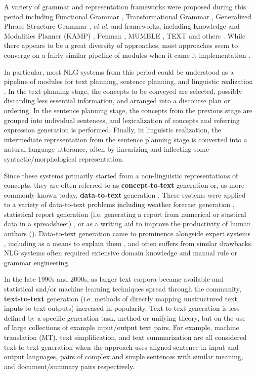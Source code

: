 A variety of grammar and representation frameworks were proposed during this
period including Functional Grammar \citep{halliday2013halliday}, Transformational Grammar \citep{chomsky1965aspects}, Generalized Phrase Structure Grammar \citep{gazdar1985generalized}, \textit{et al.} and frameworks, including Knowledge
and Modalities Planner (KAMP) \citep{appelt1982planning}, Penman \citep{hovy1993natural}, MUMBLE \citep{McDonald1981MUMBLEAF}, TEXT \citep{mckeown1982text} and others \citep{mann1981text}.
While there appears to be a great diversity of approaches, most approaches
seem to converge on a fairly similar pipeline of modules when it came 
it implementation \citep{reiter1994has}. 

In particular, most NLG systems from this
period could be understood as a pipeline of modules for text planning,
sentence planning, and linguistic realization \citep{reiter1997building}.
In the text planning stage, the concepts to be conveyed are selected,
possibly discarding less essential information, and arranged into a discourse
plan or ordering. In the sentence planning stage,
the concepts from the previous stage are grouped into individual sentences,
and lexicalization of concepts and referring expression generation is performed.
Finally, in linguistic realization, the intermediate representation from 
the sentence planning stage is converted into a natural language utterance,
often by linearizing and inflecting some syntactic/morphological representation.

Since these systems primarily started from a non-linguistic representations 
of concepts, they are often referred to as 
\textbf{concept-to-text} generation or, as more commonly known today, 
\textbf{data-to-text} generation
\citep{gatt2018survey}. These systems were applied to a variety of data-to-text
problems including weather forecast generation \citep{goldberg1994using},
statistical report  generation (i.e. generating a report from numerical
or stastical data in a spreadsheet) \citep{iordanskaja-etal-1992-generation},
or as a writing aid to improve the productivity of human authors ().
Data-to-text generation came to prominence alongside expert systems \citep{todd1992introduction},
including as a means to explain them \citep{swartout1983xplain},
and often suffers from similar drawbacks. NLG systems often required extensive 
domain knowledge and manual rule or grammar engineering.

In the late 1990s and 2000s, as larger text corpora became available and statistical 
and/or machine learning techniques spread through the community, 
\textbf{text-to-text} generation (i.e. methods
of directly mapping unstructured text inputs to text outputs) increased in
popularity. Text-to-text generation is less defined by a specific 
generation task, method or unifying
theory, but on the use of large collections of example input/output text pairs.
For example, machine 
translation (MT), text simplification, and text summarization 
are all considered text-to-text generation when the approach uses
aligned sentence in input and output languages, pairs of complex and simple
sentences with similar meaning, and document/summary pairs respectively.


